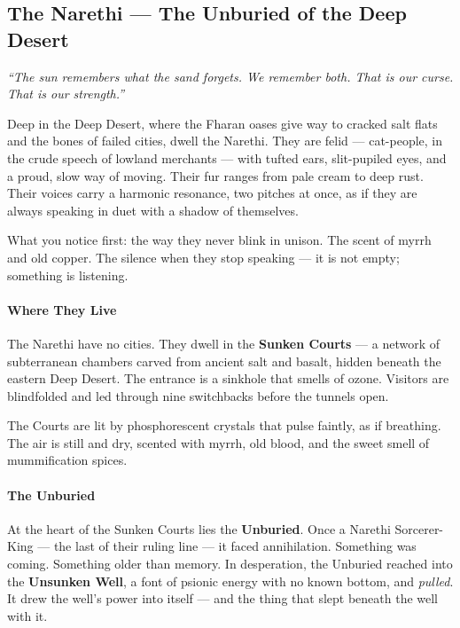 \subsection*{The Narethi --- The Unburied of the Deep Desert}
\label{subsec:narethi}

\emph{``The sun remembers what the sand forgets. We remember both. That is our curse. That is our strength.''}

Deep in the Deep Desert, where the Fharan oases give way to cracked salt flats and the bones of failed cities, dwell the Narethi. They are felid --- cat-people, in the crude speech of lowland merchants --- with tufted ears, slit-pupiled eyes, and a proud, slow way of moving. Their fur ranges from pale cream to deep rust. Their voices carry a harmonic resonance, two pitches at once, as if they are always speaking in duet with a shadow of themselves.

What you notice first: the way they never blink in unison. The scent of myrrh and old copper. The silence when they stop speaking --- it is not empty; something is listening.

\paragraph{Where They Live}
The Narethi have no cities. They dwell in the \textbf{Sunken Courts} --- a network of subterranean chambers carved from ancient salt and basalt, hidden beneath the eastern Deep Desert. The entrance is a sinkhole that smells of ozone. Visitors are blindfolded and led through nine switchbacks before the tunnels open.

The Courts are lit by phosphorescent crystals that pulse faintly, as if breathing. The air is still and dry, scented with myrrh, old blood, and the sweet smell of mummification spices.

\paragraph{The Unburied}
At the heart of the Sunken Courts lies the \textbf{Unburied}. Once a Narethi Sorcerer-King --- the last of their ruling line --- it faced annihilation. Something was coming. Something older than memory. In desperation, the Unburied reached into the \textbf{Unsunken Well}, a font of psionic energy with no known bottom, and \textit{pulled}. It drew the well's power into itself --- and the thing that slept beneath the well with it.

